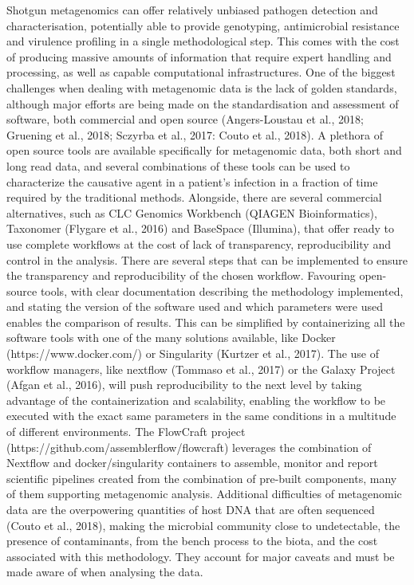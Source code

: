 Shotgun metagenomics can offer relatively unbiased pathogen detection and characterisation, potentially able to provide genotyping, antimicrobial resistance and virulence profiling in a single methodological step. This comes with the cost of producing massive amounts of information that require expert handling and processing, as well as capable computational infrastructures. 
One of the biggest challenges when dealing with metagenomic data is the lack of golden standards, although major efforts are being made on the standardisation and assessment of software, both commercial and open source \cite{} (Angers-Loustau et al., 2018; Gruening et al., 2018; Sczyrba et al., 2017: Couto et al., 2018). A plethora of open source tools are available specifically for metagenomic data, both short and long read data, and several combinations of these tools can be used to characterize the causative agent in a patient's infection in a fraction of time required by the traditional methods. Alongside, there are several commercial alternatives, such as CLC Genomics Workbench (QIAGEN Bioinformatics), Taxonomer (Flygare et al., 2016) and BaseSpace (Illumina), that offer ready to use complete workflows at the cost of lack of transparency, reproducibility and control in the analysis.
There are several steps that can be implemented to ensure the transparency and reproducibility of the chosen workflow. Favouring open-source tools, with clear documentation describing the methodology implemented, and stating the version of the software used and which parameters were used enables the comparison of results. This can be simplified by containerizing all the software tools with one of the many solutions available, like Docker (https://www.docker.com/) or Singularity (Kurtzer et al., 2017). The use of workflow managers, like nextflow (Tommaso et al., 2017) or the Galaxy Project (Afgan et al., 2016), will push reproducibility to the next level by taking advantage of the containerization and scalability, enabling the workflow to be executed with the exact same parameters in the same conditions in a multitude of different environments. The FlowCraft project (https://github.com/assemblerflow/flowcraft) leverages the combination of Nextflow and docker/singularity containers to assemble, monitor and report scientific pipelines created from the combination of pre-built components, many of them supporting metagenomic analysis.
Additional difficulties of metagenomic data are the overpowering quantities of host DNA that are often sequenced (Couto et al., 2018), making the microbial community close to undetectable, the presence of contaminants, from the bench process to the biota, and the cost associated with this methodology. They account for major caveats and must be made aware of when analysing the data.
